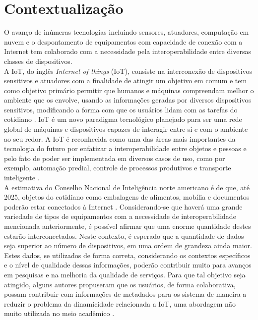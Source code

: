 \section{Contextualização}
\qquad
O avanço de inúmeras tecnologias incluindo sensores, atuadores, computação em nuvem e o despontamento de equipamentos com capacidade de conexão com a Internet tem colaborado com a necessidade pela interoperabilidade entre diversas classes de dispositivos.
\\ \null
\qquad
A \acrlong{IoT}, do inglês \textit{Internet of things} (\acrshort{IoT}), consiste na interconexão de dispositivos sensitivos e atuadores com a finalidade de atingir um objetivo em comum \cite{giusto} e tem como objetivo primário %
permitir que humanos e máquinas compreendam melhor o ambiente que os envolve, usando as informações geradas por
diversos dispositivos sensitivos, modificando a forma com que os usuários lidam com as tarefas do cotidiano \cite{IOTS}. \acrshort{IoT} é um novo paradigma tecnológico planejado para ser uma rede
global de máquinas e dispositivos capazes de interagir entre si e com o ambiente ao seu redor.
A \acrshort{IoT} é reconhecida como uma das áreas mais importantes da tecnologia do futuro por enfatizar a interoperabilidade entre objetos e pessoas e pelo fato de
poder ser implementada em diversos casos de uso, como por exemplo, automação predial, controle de processos produtivos e transporte inteligente \cite{IOTV}.
\\ \null
\qquad A estimativa do Conselho Nacional de Inteligência norte americano é de que, até 2025, objetos do cotidiano como embalagens de alimentos, mobília e documentos
poderão estar conectados à Internet \cite{intelsix}. Considerando-se que haverá uma grande variedade de tipos de equipamentos com a necessidade de interoperabilidade mencionada anteriormente,
é possível afirmar que uma enorme quantidade destes estarão interconectados. Neste contexto,
é esperado que a quantidade de dados seja superior ao número de dispositivos, em uma ordem de grandeza ainda maior.
\\ \null
\qquad Estes dados, se utilizados de forma correta, considerando os contextos específicos e o nível de qualidade dessas informações, poderão contribuir muito para avanços em pesquisas e na melhoria da qualidade de serviços. Para que tal objetivo seja atingido, alguns autores propuseram que os usuários, de forma colaborativa, possam contribuir com informações de metadados para os sistema de maneira a reduzir o problema da dinamicidade relacionada a \acrshort{IoT}, uma abordagem não muito utilizada no meio acadêmico \cite{collaborative}.
